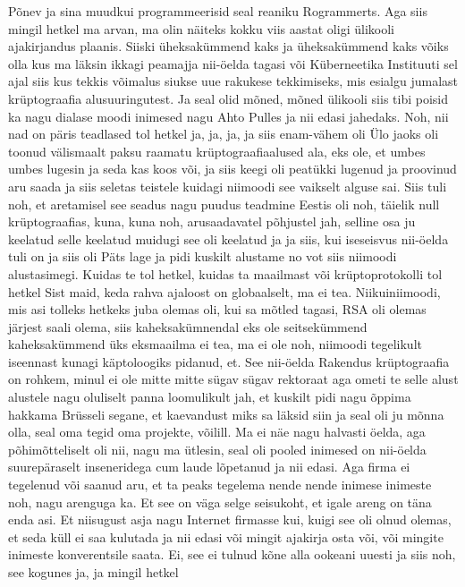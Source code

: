 Põnev ja sina muudkui programmeerisid seal reaniku Rogrammerts. Aga siis mingil hetkel ma arvan, ma olin näiteks kokku viis aastat oligi ülikooli ajakirjandus plaanis. Siiski üheksakümmend kaks ja üheksakümmend kaks võiks olla kus ma läksin ikkagi peamajja nii-öelda tagasi või Küberneetika Instituuti sel ajal siis kus tekkis võimalus siukse uue rakukese tekkimiseks, mis esialgu jumalast krüptograafia alusuuringutest. Ja seal olid mõned, mõned ülikooli siis tibi poisid ka nagu dialase moodi inimesed nagu Ahto Pulles ja nii edasi jahedaks. Noh, nii nad on päris teadlased tol hetkel ja, ja, ja, ja siis enam-vähem oli Ülo jaoks oli toonud välismaalt paksu raamatu krüptograafiaalused ala, eks ole, et umbes umbes lugesin ja seda kas koos või, ja siis keegi oli peatükki lugenud ja proovinud aru saada ja siis seletas teistele kuidagi niimoodi see vaikselt alguse sai. Siis tuli noh, et aretamisel see seadus nagu puudus teadmine Eestis oli noh, täielik null krüptograafias, kuna, kuna noh, arusaadavatel põhjustel jah, selline osa ju keelatud selle keelatud muidugi see oli keelatud ja ja siis, kui iseseisvus nii-öelda tuli on ja siis oli Päts lage ja pidi kuskilt alustame no vot siis niimoodi alustasimegi. Kuidas te tol hetkel, kuidas ta maailmast või krüptoprotokolli tol hetkel Sist maid, keda rahva ajaloost on globaalselt, ma ei tea. Niikuiniimoodi, mis asi tolleks hetkeks juba olemas oli, kui sa mõtled tagasi, RSA oli olemas järjest saali olema, siis kaheksakümnendal eks ole seitsekümmend kaheksakümmend üks eksmaailma ei tea, ma ei ole noh, niimoodi tegelikult iseennast kunagi käptoloogiks pidanud, et.
See nii-öelda Rakendus krüptograafia on rohkem, minul ei ole mitte mitte sügav sügav rektoraat aga ometi te selle alust alustele nagu oluliselt panna loomulikult jah, et kuskilt pidi nagu õppima hakkama Brüsseli segane, et kaevandust miks sa läksid siin ja seal oli ju mõnna olla, seal oma tegid oma projekte, võilill. Ma ei näe nagu halvasti öelda, aga põhimõtteliselt oli nii, nagu ma ütlesin, seal oli pooled inimesed on nii-öelda suurepäraselt inseneridega cum laude lõpetanud ja nii edasi. Aga firma ei tegelenud või saanud aru, et ta peaks tegelema nende nende inimese inimeste noh, nagu arenguga ka. Et see on väga selge seisukoht, et igale areng on täna enda asi. Et niisugust asja nagu Internet firmasse kui, kuigi see oli olnud olemas, et seda küll ei saa kulutada ja nii edasi või mingit ajakirja osta või, või mingite inimeste konverentsile saata. Ei, see ei tulnud kõne alla ookeani uuesti ja siis noh, see kogunes ja, ja mingil hetkel
